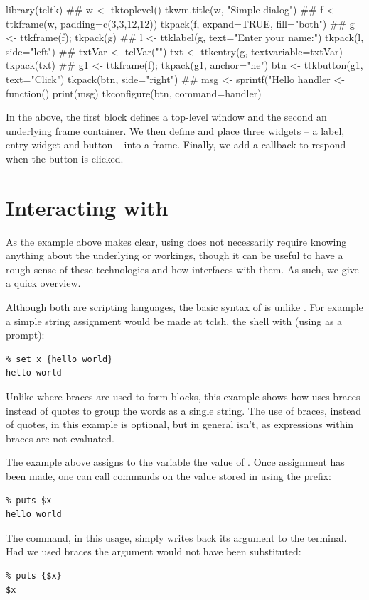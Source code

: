 \begin{Schunk}
\begin{Sinput}
 library(tcltk)
 ##
 w <- tktoplevel()
 tkwm.title(w, "Simple dialog")
 ##
 f <- ttkframe(w, padding=c(3,3,12,12))
 tkpack(f, expand=TRUE, fill="both")
 ##
 g <- ttkframe(f); tkpack(g)
 ##
 l <- ttklabel(g, text="Enter your name:")
 tkpack(l, side="left")
 ##
 txtVar <- tclVar("")
 txt <- ttkentry(g, textvariable=txtVar)
 tkpack(txt)
 ##
 g1 <- ttkframe(f); tkpack(g1, anchor="ne")
 btn <- ttkbutton(g1, text="Click")
 tkpack(btn, side="right")
 ##
 msg <- sprintf("Hello %
 handler <- function() print(msg)
 tkconfigure(btn, command=handler)
\end{Sinput}
\end{Schunk}
In the above, the first block defines a top-level window and the
second an underlying frame container. We then define and place three
widgets -- a label, entry widget and button -- into a frame. Finally,
we add a callback to respond when the button is clicked.


\section{Interacting with \TCL}
\label{sec:tcltk:interacting-with-tcl}

As the example above makes clear, using  does not
necessarily require knowing anything about the underlying \Tk{} or
\Tcl{} workings, though it can be useful to have a rough sense of these
technologies and how  interfaces with them. As such, we
give a quick overview.


Although both are scripting languages, the basic syntax of \TCL\/ is
unlike \R. For example a simple string assignment would be made at
tclsh, the \TCL\/ shell with (using \code{\%} as a prompt):
\begin{verbatim}
% set x {hello world}
hello world
\end{verbatim}
Unlike \R\/ where braces are used to form blocks, this example shows
how \TCL\/ uses braces instead of quotes to group the words as a
single string. The use of braces, instead of quotes, in this example
is optional, but in general isn't, as expressions within braces are
not evaluated.  

The example above assigns to the variable  the
value of . Once assignment has been made, one can
call commands on the value stored in  using the \code{\$}
prefix:
\begin{verbatim}
% puts $x
hello world
\end{verbatim}
The  command, in this usage, simply writes back its argument to the terminal. Had
we used braces the argument would not have been substituted:
\begin{verbatim}
% puts {$x}
$x
\end{verbatim}

